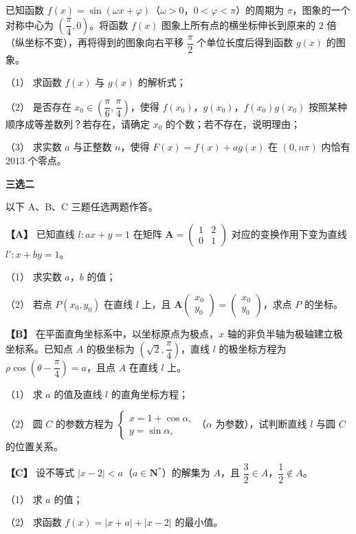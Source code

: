 \begin{question}
已知函数 $f(x)=\sin(\omega x+\varphi)$（$\omega>0$，$0<\varphi<\pi$）的周期为 $\pi$，图象的一个对称中心为 $\left(\dfrac\pi4,0\right)$。将函数 $f(x)$ 图象上所有点的横坐标伸长到原来的 $2$ 倍（纵坐标不变），再将得到的图象向右平移 $\dfrac\pi2$ 个单位长度后得到函数 $g(x)$ 的图象。

（1） 求函数 $f(x)$ 与 $g(x)$ 的解析式；

（2） 是否存在 $x_0\in\left(\dfrac\pi6,\dfrac\pi4\right)$，使得 $f(x_0)$，$g(x_0)$，$f(x_0)g(x_0)$ 按照某种顺序成等差数列？若存在，请确定 $x_0$ 的个数；若不存在，说明理由；

（3） 求实数 $a$ 与正整数 $n$，使得 $F(x)=f(x)+ag(x)$ 在 $(0,n\pi)$ 内恰有 $2013$ 个零点。

\end{question}
\begin{question}
\textbf{三选二} 

以下 A、B、C 三题任选两题作答。

\textbf{【A】} 已知直线 $l:ax+y=1$ 在矩阵 $\boldsymbol A=\begin{pmatrix}1&2\\0&1\end{pmatrix}$ 对应的变换作用下变为直线 $l':x+by=1$。

（1） 求实数 $a$，$b$ 的值；

（2） 若点 $P(x_0,y_0)$ 在直线 $l$ 上，且 $\boldsymbol A\begin{pmatrix}x_0\\y_0\end{pmatrix}=\begin{pmatrix}x_0\\y_0\end{pmatrix}$，求点 $P$ 的坐标。

\textbf{【B】} 在平面直角坐标系中，以坐标原点为极点，$x$ 轴的非负半轴为极轴建立极坐标系。已知点 $A$ 的极坐标为 $\left(\sqrt2,\dfrac\pi4\right)$，直线 $l$ 的极坐标方程为 $\rho\cos\left(\theta-\dfrac\pi4\right)=a$，且点 $A$ 在直线 $l$ 上。

（1） 求 $a$ 的值及直线 $l$ 的直角坐标方程；

（2） 圆 $C$ 的参数方程为 $\begin{cases}x=1+\cos\alpha,\\y=\sin\alpha,\end{cases}$（$\alpha$ 为参数），试判断直线 $l$ 与圆 $C$ 的位置关系。

\textbf{【C】} 设不等式 $|x-2|<a$（$a\in\mathbf N^*$）的解集为 $A$，且 $\dfrac32\in A$，$\dfrac12\notin A$。

（1） 求 $a$ 的值；

（2） 求函数 $f(x)=|x+a|+|x-2|$ 的最小值。

\end{question}